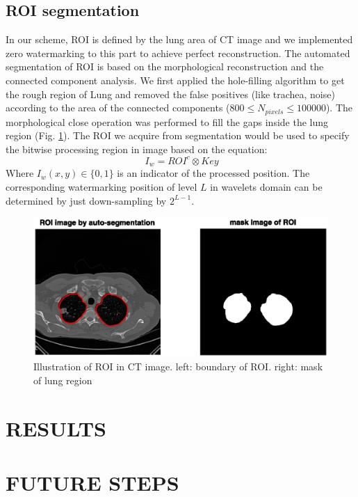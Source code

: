 \documentclass[letterpaper, 10 pt, conference]{ieeeconf}  %
\begin{document}
\subsection{ROI segmentation}
In our scheme, ROI is defined by the lung area of CT image and we implemented zero watermarking to this part to achieve perfect reconstruction. The automated segmentation of ROI is based on the morphological reconstruction and the connected component analysis. We first applied the hole-filling algorithm to get the rough region of Lung and removed the false positives (like trachea, noise) according to the area of the connected components ($800 \leq N_{pixels} \leq100000$). The morphological close operation was performed to fill the gaps inside the lung region (Fig. \ref{ROI}). The ROI we acquire from segmentation would be used to specify the bitwise processing region in image based on the equation:
\[\ I_w = ROI^c \otimes Key\]
Where $I_w(x,y)\in\{0,1\}$ is an indicator of  the processed position. The corresponding watermarking position of level $L$ in wavelets domain can be determined by just down-sampling by $2^{L-1}$.
\begin{figure}[htbp]
	\centering
	\includegraphics[width=1\linewidth]{ROI}
	\caption{Illustration of ROI in CT image. left: boundary of ROI. right: mask of lung region}
	\label{ROI}
\end{figure}

\subsection{}

\section{RESULTS}

\section{FUTURE STEPS}
\end{document}
